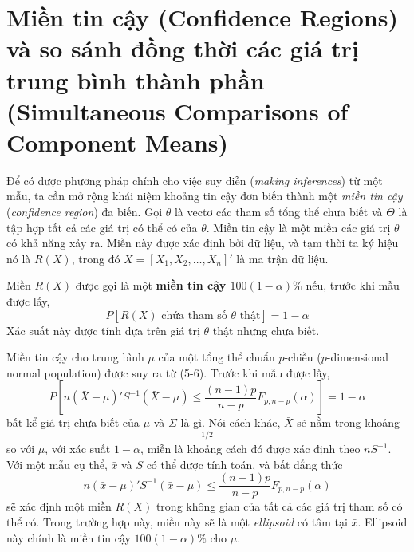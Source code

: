 
\section{Miền tin cậy (Confidence Regions) và so sánh đồng thời các giá trị trung bình thành phần (Simultaneous Comparisons of Component Means)}
\label{sec:ch05-04}

Để có được phương pháp chính cho việc suy diễn (\textit{making inferences}) từ một mẫu, ta cần mở rộng khái niệm khoảng tin cậy đơn biến thành một \textit{miền tin cậy} (\textit{confidence region}) đa biến. Gọi $\theta$ là vectơ các tham số tổng thể chưa biết và $\Theta$ là tập hợp tất cả các giá trị có thể có của $\theta$. Miền tin cậy là một miền các giá trị $\theta$ có khả năng xảy ra. Miền này được xác định bởi dữ liệu, và tạm thời ta ký hiệu nó là $R(X)$, trong đó $X = [X_1, X_2, \dots, X_n]'$ là ma trận dữ liệu.

Miền $R(X)$ được gọi là một \textbf{miền tin cậy $100(1 - \alpha)\%$} nếu, trước khi mẫu được lấy,
\begin{equation}
P[R(X) \text{ chứa tham số } \theta \text{ thật}] = 1 - \alpha \tag{5-17}
\end{equation}
Xác suất này được tính dựa trên giá trị $\theta$ thật nhưng chưa biết.

Miền tin cậy cho trung bình $\mu$ của một tổng thể chuẩn $p$-chiều ($p$-dimensional normal population) được suy ra từ (5-6). Trước khi mẫu được lấy,
\begin{equation*}
P \left[ n(\bar{X} - \mu)'S^{-1}(\bar{X} - \mu) \le \frac{(n-1)p}{n-p} F_{p, n-p}(\alpha) \right] = 1 - \alpha
\end{equation*}
bất kể giá trị chưa biết của $\mu$ và $\Sigma$ là gì. Nói cách khác, $\bar{X}$ sẽ nằm trong khoảng 
\begin{equation*}
[(n - 1)p F_{p,n-p}(\alpha) / (n - p)]^{1/2}
\end{equation*}
so với $\mu$, với xác suất $1 - \alpha$, miễn là khoảng cách đó được xác định theo $nS^{-1}$. Với một mẫu cụ thể, $\bar{x}$ và $S$ có thể được tính toán, và bất đẳng thức
\begin{equation*}
n(\bar{x} - \mu)'S^{-1}(\bar{x} - \mu) \le \frac{(n-1)p}{n-p} F_{p,n-p}(\alpha)
\end{equation*}
sẽ xác định một miền $R(X)$ trong không gian của tất cả các giá trị tham số có thể có. Trong trường hợp này, miền này sẽ là một \textit{ellipsoid} có tâm tại $\bar{x}$. Ellipsoid này chính là miền tin cậy $100(1 - \alpha)\%$ cho $\mu$.

